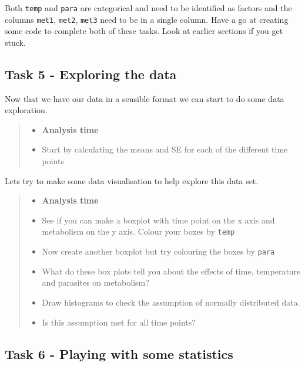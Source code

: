 \documentclass[
]{book}
\providecommand{\tightlist}{%
  \setlength{\itemsep}{0pt}\setlength{\parskip}{0pt}}
\begin{document}
Both \texttt{temp} and \texttt{para} are categorical and need to be identified as factors and the columns \texttt{met1}, \texttt{met2}, \texttt{met3} need to be in a single column. Have a go at creating some code to complete both of these tasks. Look at earlier sections if you get stuck.

\subsection{Task 5 - Exploring the data}\label{task-5---exploring-the-data}

Now that we have our data in a sensible format we can start to do some data exploration.

\begin{quote}
\begin{itemize}
\tightlist
\item
  \textbf{Analysis time}
\item
  Start by calculating the means and SE for each of the different time points
\end{itemize}
\end{quote}

Lets try to make some data visualisation to help explore this data set.

\begin{quote}
\begin{itemize}
\tightlist
\item
  \textbf{Analysis time}
\item
  See if you can make a boxplot with time point on the x axis and metabolism on the y axis. Colour your boxes by \texttt{temp}
\item
  Now create another boxplot but try colouring the boxes by \texttt{para}
\item
  What do these box plots tell you about the effects of time, temperature and parasites on metabolism?
\item
  Draw histograms to check the assumption of normally distributed data.
\item
  Is this assumption met for all time points?
\end{itemize}
\end{quote}

\subsection{Task 6 - Playing with some statistics}\label{task-6---playing-with-some-statistics}
\end{document}
